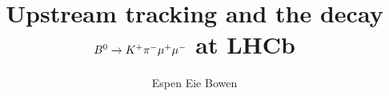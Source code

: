 \documentclass[12pt,a4paper]{article}
\numberwithin{equation}{section}
\begin{document}

\title{Upstream tracking and the decay ${B}^{0} \rightarrow K^{+}\pi^{-}\mu^{+}\mu^{-}$ at LHCb}
\author{Espen Eie Bowen}

\maketitle
\clearpage\mbox{}\clearpage%

\setcounter{page}{3}


\clearpage

\clearpage
\begingroup
\hypersetup{linkcolor=black}
\tableofcontents
\endgroup
\clearpage

\linenumbers%


\clearpage

\clearpage

\clearpage

\clearpage

\clearpage

\clearpage

\clearpage

\clearpage
\printbibliography[heading=bibintoc,title={Bibliography}]
\end{document}
